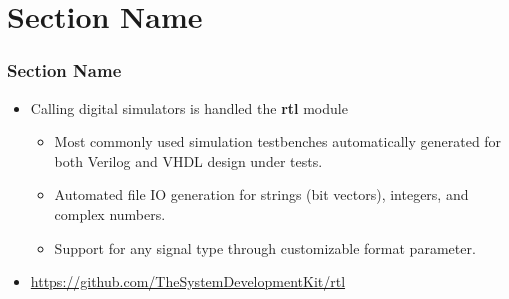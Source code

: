 \documentclass[logo=bluequo,normaltitle]{aaltoslides}
\newcommand{\sectname}{Section Name}
\begin{document}
\section{\sectname}
\begin{frame}[t]
    \frametitle{\sectname}
    \begin{itemize}
        \item Calling digital simulators is handled the \textbf{rtl} module
        \begin{itemize}
            \item Most commonly used simulation testbenches automatically
                generated for both Verilog and VHDL design under tests.
            \item Automated file IO generation for strings (bit vectors), integers, and complex numbers. 
            \item Support for any signal type through customizable format
                parameter.
        \end{itemize}
        \item \url{https://github.com/TheSystemDevelopmentKit/rtl}
    \end{itemize}
\end{frame}
\end{document}
